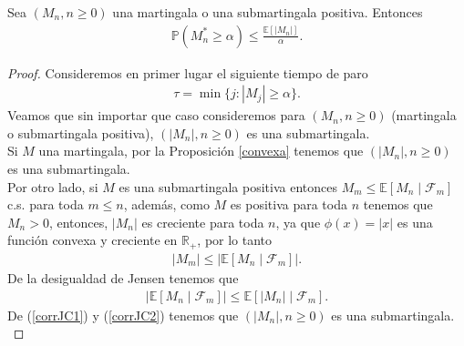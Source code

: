 \begin{theorem} 
\label{primera}
	Sea $(M_n, n \geq 0)$ una martingala o una submartingala positiva. Entonces
	\begin{align*}
		\mathbb{P}(M_n^{*} \geq \alpha) \leq \frac{\mathbb{E}[|M_n|]}{\alpha}.
	\end{align*}
\end{theorem}
\begin{proof}
	Consideremos en primer lugar el siguiente tiempo de paro
	\begin{align*}
		\tau = \min \{j : |M_j| \geq \alpha\}.
	\end{align*}
	Veamos que sin importar que caso consideremos para $(M_n, n \geq 0)$ (martingala o submartingala positiva), $(|M_n|, n \geq 0)$ es una submartingala. \\ 
	
	Si $M$ una martingala, por la Proposición \ref{convexa} tenemos que $(|M_n|, n \geq 0)$ es una submartingala. \\
	
	Por otro lado, si $M$ es una submartingala positiva entonces $M_m \leq \mathbb{E}[M_n \mid \mathcal{F}_m]$ c.s. para toda $m \leq n$, además, como $M$ es positiva para toda $n$ tenemos que $M_n > 0$, entonces, $|M_n|$ es creciente para toda $n$, ya que $\phi(x) = |x|$ es una función convexa y creciente en $\mathbb{R}_{+}$, por lo tanto
	\begin{align}
	|M_m| \leq  |\mathbb{E}[M_n \mid \mathcal{F}_m]|. \label{corrJC1}
	\end{align}
De la desigualdad de Jensen tenemos que 
	\begin{align}
	|\mathbb{E}[M_n \mid \mathcal{F}_m]| \leq \mathbb{E}[|M_n| \mid \mathcal{F}_m]. \label{corrJC2}
	\end{align}
De (\ref{corrJC1}) y (\ref{corrJC2}) tenemos que $(|M_n|, n \geq 0)$ es una submartingala. \\
	

\end{proof}
